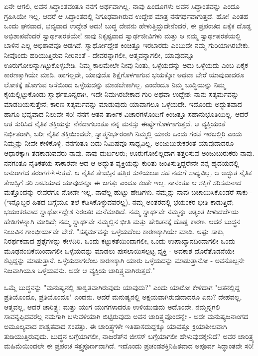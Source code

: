 ಏನೇ ಆಗಲಿ, ಅವನ ಸಿದ್ಧಾಂತವಂತೂ ನನಗೆ ಅರ್ಥವಾಗಿಲ್ಲ. ನಾವು ಹಿಂದೂಗಳು ಅವನ ಸಿದ್ಧಾಂತವನ್ನು ಎಂದೂ ಗ್ರಹಿಸಿಯೇ ಇಲ್ಲ. ಆದರೆ ಆ ಸಿದ್ಧಾಂತದಲ್ಲಿ ನಿಗೂಢವಾಗಿರುವ ಉದ್ದೇಶ ಮಾತ್ರ ನನಗರ್ಥವಾಗುತ್ತದೆ. ಹೋ! ಎಂತಹ ಒಂದು ಘನವಾದ, ಭವ್ಯವಾದ ಉದ್ದೇಶ ಅದು! ಬುದ್ಧ ದೇವನು ಹೇಳುತ್ತಿದ್ದುದೇನೆಂದರೆ, ಈ ಪ್ರಪಂಚದ ಏಕೈಕ ದೊಡ್ಡ ಅಭಿಶಾಪವೆಂದರೆ ಸ್ವಾರ್ಥಪರತೆಯೇ! ನಾವು ನಿಕೃಷ್ಟವಾದ ಸ್ವಾರ್ಥಜೀವಿಗಳು ಮತ್ತು ಆ ನಮ್ಮ ಸ್ವಾರ್ಥಪರತೆಯಲ್ಲಿ ಬಾಳಿನ ಎಲ್ಲ ಅಭಿಶಾಪವೂ ಅಡಗಿದೆ. ಸ್ವಾರ್ಥೋದ್ದೇಶ ಕಿಂಚಿತ್ತೂ ಇರಬಾರದು ಎಂಬುದೇ ನಮ್ಮ ಗುರಿಯಾಗಿರಬೇಕು. ನೀವೊಂದು ಹರಿಯುತ್ತಿರುವ ನೀರಿನಂತೆ - ದೇವರನ್ನಾಗಲೀ, ಆತ್ಮವನ್ನಾಗಲೀ, ಯಾವುದನ್ನೂ ಊರುಗೋಲನ್ನಾಗಿಟ್ಟುಕೊಳ್ಳಬೇಡಿ. ನಿಮ್ಮ ಕಾಲಮೇಲೇ ನೀವು ನಿಂತು, ಒಳ್ಳೆಯದನ್ನು ಅದು ಒಳ್ಳೆಯದು ಎಂಬ ಏಕೈಕ ಕಾರಣಕ್ಕಾಗಿಯೇ ಮಾಡಿ. ಹಾಗಲ್ಲದೇ, ಯಾವುದೊ ಶಿಕ್ಷೆಗೊಳಗಾಗುವ ಭಯಕ್ಕೋ ಅಥವಾ ಬೇರೆ ಯಾವುದಾದರೂ ಲೋಕಕ್ಕೆ ಹೋಗುವ ಆಸೆಯಿಂದ ಒಳ್ಳೆಯದನ್ನು ಮಾಡಬೇಕಾಗಿಲ್ಲ. ಎಂದೆಂದೂ ನಿಮ್ಮ ಬುದ್ಧಿಯನ್ನು ನಿಮ್ಮ ಕೈಯಲ್ಲಿಟ್ಟುಕೊಂಡು ಸ್ವಾರ್ಥಶೂನ್ಯರಾಗಿ, ಇದೇ ನಿಮಗಿರಬೇಕಾದ ಗುರಿ ಅಥವಾ ಉದ್ದೇಶ: ನಾನು ಸತ್ಕರ್ಮವನ್ನು ಮಾಡಬಯಸುತ್ತೇನೆ; ಕಾರಣ ಸತ್ಕರ್ಮವನ್ನು ಮಾಡುವುದು ಯಾವಾಗಲೂ ಒಳ್ಳೆಯದೇ. ಇದೊಂದು ಅದ್ಭುತವಾದ ಹಾಗೂ ಭವ್ಯವಾದ ನಿಲುವೇ ಸರಿ! ನನಗೆ ಆತನ ತಾರ್ಕಿಕ ವಿಚಾರಗಳೊಂದಿಗೆ ಕಿಂಚಿತ್ತೂ ಸಹಾನುಭೂತಿಯಿಲ್ಲ. ಆದರೆ ಆತ ಸುರಿಸಿದ ನೈತಿಕ ಶಕ್ತಿಯನ್ನು ನೆನೆದಾಗಲಂತೂ ನನ್ನ ಮನಸ್ಸು ಈರ್ಷ್ಯೆಗೊಳಗಾಗುತ್ತದೆ. ಆ ವ್ಯಕ್ತಿಯಂತೆ ನಿರ್ಭಿತರಾಗಿ, ಬರೀ ನೈತಿಕ ಶಕ್ತಿಯಿಂದಲೇ, ಸ್ವಾತ್ಮನಿರ್ಭರರಾಗಿ ನಿಮ್ಮಲ್ಲಿ ಯಾರು ಒಂದು ಗಂಟೆ ಇರಬಲ್ಲಿರಿ ಎಂದು ನಿಮ್ಮನ್ನು ನೀವೇ ಕೇಳಿಕೊಳ್ಳಿ. ನನಗಂತೂ ಐದು ನಿಮಿಷವೂ ಸಾಧ್ಯವಿಲ್ಲ. ಅಂಜುಬುರುಕರಂತೆ ಯಾವುದಾದರೂ ಆಧಾರಕ್ಕಾಗಿ ತಡಕಾಡುವವರು ನಾವು. ನಾವು ದುರ್ಬಲರು; ಊರುಗೋಲಿಲ್ಲದಾಗ ತತ್ತರಿಸುವ ಅಂಜುಬುರುಕರು ನಾವು. ನನಗಂತೂ ನೈತಿಕತೆಯ ಸಾಕಾರವೇ ಆದ ಆ ಅದ್ಭುತ ವ್ಯಕ್ತಿಯನ್ನು ಕುರಿತು ಚಿಂತಿಸುತ್ತಿದ್ದರೇನೇ ನನ್ನ ಹೃದಯದಲ್ಲಿ ಅನುರಾಗದ ತರಂಗಗಳೇಳುತ್ತವೆ. ಆ ನೈತಿಕ ತೇಜಸ್ಸಿನ ಹತ್ತಿರ ಸುಳಿಯಲೂ ಸಹ ನಮಗೆ ಸಾಧ್ಯವಿಲ್ಲ. ಆ ಅದ್ಭುತ ನೈತಿಕ ತೇಜಸ್ಸಿಗೆ ಸರಿ ಸಾಟಿಯಾದ ಯಾವುದನ್ನೂ ಈ ಜಗತ್ತು ಎಂದೂ ಕಂಡೇ ಇಲ್ಲ. ನಾನಂತೂ ಆ ಶಕ್ತಿಗೆ ಸರಿಸಮನಾದ ಮತ್ತೊಂದನ್ನು ಈವರೆಗೂ ನೋಡೇ ಇಲ್ಲ. ನಾವೆಲ್ಲ ಹುಟ್ಟು ಹೇಡಿಗಳು. ನಮ್ಮನ್ನು ನಾವು ಬಚಾಯಿಸಿಕೊಂಡರೆ ಸಾಕು - (ಇನ್ನೊಬ್ಬರ ಹಿತದ ಬಗ್ಗೆಯೂ ತಲೆ ಕೆಡಿಸಿಕೊಳ್ಳುವವರಲ್ಲ). ನಮ್ಮ ಅಂತರದಲ್ಲಿ ಭಯಂಕರ ಭೀತಿ ಕಾಡುತ್ತಿದೆ; ಭಯಂಕರವಾದ ಸ್ವಾರ್ಥೋದ್ದೇಶ ನಿರಂತರ ಮನೆಮಾಡಿದೆ. ನಮ್ಮ ಸ್ವಾರ್ಥವೇ ನಮ್ಮನ್ನು ಅತ್ಯಂತ ಕೀಳುದರ್ಜೆಯ ಹೇಡಿಗಳನ್ನಾಗಿ ಮಾಡಿದೆ; ನಮ್ಮ ಸ್ವಾರ್ಥವೇ ನಮ್ಮಲ್ಲಿನ ಭೀತಿ ಮತ್ತು ಹೇಡಿತನಕ್ಕೆ ದೊಡ್ಡ ಕಾರಣ. ಆದರೆ ಬುದ್ಧನ ನಿಲುವಿನ ಗಾಂಭೀರ್ಯವೇ ಬೇರೆ. "ಸತ್ಕರ್ಮವನ್ನು ಒಳ್ಳೆಯದೆಂಬ ಕಾರಣಕ್ಕಾಗಿಯೇ ಮಾಡಿ. ಅಷ್ಟು ಸಾಕು, ನಿರರ್ಥಕವಾದ ಪ್ರಶ್ನೆಗಳನ್ನು ಕೇಳದಿರಿ. ಒಂದು ಕಟ್ಟುಕತೆಯಿಂದಾಗಲೀ, ಒಂದು ಉಪಾಖ್ಯಾನದಿಂದಾಗಲೀ ಒಂದು ಮೂಢನಂಬಿಕೆಯಿಂದಾಗಲೀ ಒಳ್ಳೆಯದನ್ನು ಮಾಡಲು ಪುಸಲಾಯಿಸಲ್ಪಟ್ಟ ವ್ಯಕ್ತಿ - ಅವಕಾಶ ದೊರೆತೊಡನೆಯೇ ಕೆಟ್ಟದ್ದನ್ನು ಮಾಡುತ್ತಾನೆ. ಒಳ್ಳೆಯದಾಗಲೆಂಬ ಕಾರಣಕ್ಕಾಗಿ ಯಾರು ಒಳ್ಳೆಯದನ್ನು ಮಾಡುತ್ತಾನೋ - ಅವನೊಬ್ಬನೇ ನಿಜವಾಗಿಯೂ ಒಳ್ಳೆಯವನು. ಅದೇ ಆ ವ್ಯಕ್ತಿಯ ಚಾರಿತ್ರ್ಯವಾಗಿರುತ್ತದೆ."

ಒಮ್ಮೆ ಬುದ್ಧನನ್ನು "ಮನುಷ್ಯನಲ್ಲಿ ಶಾಶ್ವತವಾಗಿರುವುದು ಯಾವುದು?" ಎಂದು ಯಾರೋ ಕೇಳಿದಾಗ "ಆತನಲ್ಲಿದ್ದ ಪ್ರತಿಯೊಂದೂ, ಪ್ರತಿಯೊಂದೂ" ಎಂದನು. ಆದರೆ ಮನುಷ್ಯನಲ್ಲಿ ಅಕ್ಷಯವಾಗಿರುವುದಾದರೂ ಏನು? ದೇಹವಲ್ಲ, ಆತ್ಮವಲ್ಲ, ಆದರೆ ಚಾರಿತ್ರ್ಯ; ಮತ್ತು ಯುಗ ಯುಗಗಳಾದರೂ ಉಳಿಯುವುದು ಅದೊಂದೇ. ನಮ್ಮನ್ನಗಲಿ ಸಾವನ್ನಪ್ಪಿದವರೆಲ್ಲ ನಮಗಾಗಿ ಬಳುವಳಿಯಾಗಿ ಬಿಟ್ಟಿರುವುದು ಅವನ ಚಾರಿತ್ರ್ಯವೊಂದನ್ನೇ - ಅದೇ ಮನುಷ್ಯಜನಾಂಗದ ಅಮೂಲ್ಯವಾದ ಶಾಶ್ವತವಾದ ಸಂಪತ್ತು. ಈ ಚಾರಿತ್ರ್ಯಗಳೇ ಇತಿಹಾಸದುದ್ದಕ್ಕೂ ಯಾವತ್ತೂ ಕ್ರಿಯಾಶೀಲವಾಗಿ ತುಡಿಯುತ್ತಿರುವುದು. ಬುದ್ಧನ ಬಗ್ಗೆಯಾಗಲೀ, ನಾಜರೆತ್‌ನ ಜೀಸಸ್ ಬಗ್ಗೆಯಾಗಲೀ ಹೇಳುವುದಕ್ಕೇನಿದೆ? ಅವರ ಚಾರಿತ್ರ್ಯ ಮಹಿಮೆಯಿಂದಲೇ ಈ ಪ್ರಪಂಚ ಸತ್ತ್ವಪೂರ್ಣವಾಗಿದೆ. ಇದೊಂದು ಪ್ರಚಂಡಶಕ್ತಿನಿಹಿತವಾದ ಅಪೂರ್ವ ಸಿದ್ಧಾಂತವೇ ಸರಿ!

